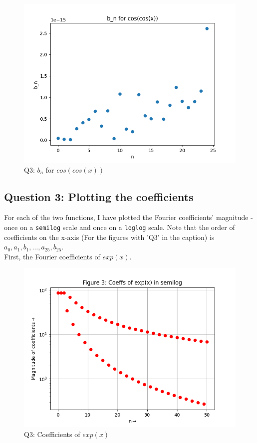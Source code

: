\documentclass[11pt, a4paper]{article}
\begin{document}
	\begin{figure}[!tbh]
   	\centering
  \includegraphics[scale=0.5]{bn-cos.png} 
    \caption{Q3: $b_{n}$ for $cos(cos(x))$}
   	\label{fig:bn for coscos()}
   \end{figure}
   
  \newpage
  \subsection{Question 3: Plotting the coefficients}
  For each of the two functions, I have plotted the Fourier coefficients' magnitude - once on a \texttt{semilog} scale and once on a \texttt{loglog} scale. Note that the order of coefficients on the x-axis (For the figures with 'Q3' in the caption) is $a_{0}, a_{1}, b_{1}, \ldots{},a_{25}, b_{25}$.\\
  First, the Fourier coefficients of $exp(x)$.
  
  \begin{figure}[!tbh]
   	\centering
  \includegraphics[scale=0.5]{q3-f1-semilog.png} 
    \caption{Q3: Coefficients of $exp(x)$}
   	\label{fig:Q3-f1-semilog}
   \end{figure}
\end{document}
